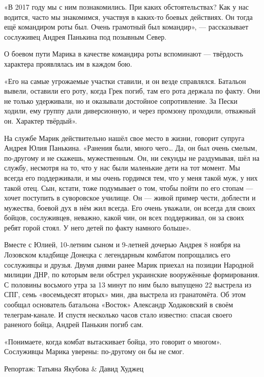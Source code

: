 «В 2017 году мы с ним познакомились. При каких обстоятельствах? Как у нас
водится, часто мы знакомимся, участвуя в каких-то боевых действиях. Он тогда
ещё командиром роты был. Очень грамотный был командир», --- рассказывает
сослуживец Андрея Панькина под позывным Север.

О боевом пути Марика в качестве командира роты вспоминают --- твёрдость характера
проявлялась им в каждом бою.

«Его на самые угрожаемые участки ставили, и он везде справлялся. Батальон
вывели, оставили его роту, когда Грек погиб, там его рота держала по факту. Они
не только удерживали, но и оказывали достойное сопротивление. За Пески ходили,
ему группу дали диверсионную, и через промзону проходили, отважный он. Характер
твёрдый».

На службе Марик действительно нашёл свое место в жизни, говорит супруга Андрея
Юлия Панькина.  «Ранения были, много чего… Да, он был очень смелым, по-другому
и не скажешь, мужественным. Он, ни секунды не раздумывая, шёл на службу,
несмотря на то, что у нас были маленькие дети на тот момент. Мы всегда его
поддерживали, и мы очень гордимся тем, что у меня такой муж, у них такой отец.
Сын, кстати, тоже подумывает о том, чтобы пойти по его стопам --- хочет поступить
в суворовское училище. Он --- живой пример чести, доблести и мужества, боевой дух
в нём жил всегда. Его очень уважали, он всегда для своих бойцов, сослуживцев,
неважно, какой чин, он всех поддерживал, он за своих ребят горой стоял. У него
детей по факту намного больше».

Вместе с Юлией, 10-летним сыном и 9-летней дочерью Андрея 8 ноября на Лозовском
кладбище Донецка с легендарным комбатом попрощались его сослуживцы и друзья.
Двумя днями ранее Марик приехал на позиции Народной милиции ДНР, по которым
вели обстрел украинские вооружённые формирования. С половины восьмого утра за
13 минут по ним было выпущено 22 выстрела из СПГ, семь «восемьдесят вторых»
мин, два выстрела из гранатомёта. Об этом сообщал основатель батальона «Восток»
Александр Ходаковский в своём телеграм-канале. И спустя несколько часов стало
известно: спасая своего раненого бойца, Андрей Панькин погиб сам.

«Понимаете, когда комбат вытаскивает бойца, это говорит о многом». Сослуживцы
Марика уверены: по-другому он бы не смог.

Репортаж: Татьяна Якубова \& Давид Худжец

